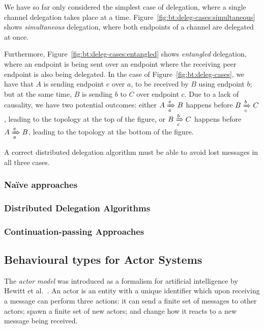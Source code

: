 \documentclass[
graybox,
envcountchap
]{svmult}
\begin{document}
\begin{bibunit}
  We have so far only considered the simplest case of delegation, where a single
  channel delegation takes place at a time.
  Figure~\ref{fig:bt:deleg-cases:simultaneous} shows \emph{simultaneous}
  delegation, where both endpoints of a channel are delegated at once.

  Furthermore, Figure~\ref{fig:bt:deleg-cases:entangled} shows \emph{entangled}
  delegation, where an endpoint is being sent over an endpoint where the
  receiving peer endpoint is also being delegated. In the case of
  Figure~\ref{fig:bt:deleg-cases}, we have that $A$ is sending endpoint $e$ over
  $a$, to be received by $B$ using endpoint $b$; but at the same time, $B$ is
  sending $b$ to $C$ over endpoint $c$. Due to a lack of causality, we have two
  potential outcomes: either $\triestosend{A}{e}{B}{a}$ happens before
  $\triestosend{B}{b}{C}{c}$, leading to the topology at the top of the figure,
  or $\triestosend{B}{b}{C}{c}$ happens before $\triestosend{A}{e}{B}{a}$,
  leading to the topology at the bottom of the figure.

  A correct distributed delegation algorithm must be able to avoid lost messages
  in all three cases.

  \subsubsection{Na\"ive approaches}
  \subsubsection{Distributed Delegation Algorithms}

  \subsubsection{Continuation-passing Approaches}

  \subsection{Behavioural types for Actor Systems}\label{sec:bt:actor-types}
  The \emph{actor model} was introduced as a formalism for artificial
  intelligence by Hewitt et al.~\cite{HewittBS73:actors}. An actor is an entity with a
  unique identifier which upon receiving a message can perform
  three actions: it can send a finite set of messages to other actors; spawn a
  finite set of new actors; and change how it reacts to a new message being
  received.


\end{bibunit}
\end{document}
